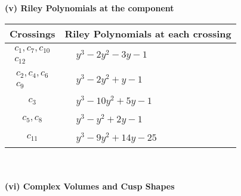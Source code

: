 \documentclass[1p]{elsarticle_modified}
\theoremstyle{definition}
\begin{document}
\newpage\renewcommand{\arraystretch}{1}
\flushleft \textbf{(v) Riley Polynomials at the component}\newline \\
\begin{tabular}{m{50pt}|m{274pt}}
Crossings & \hspace{64pt}Riley Polynomials at each crossing \\
\hline $$\begin{aligned}c_{1},c_{7},c_{10}\\c_{12}\end{aligned}$$&$\begin{aligned}
&y^3-2 y^2-3 y-1
\end{aligned}$\\
\hline $$\begin{aligned}c_{2},c_{4},c_{6}\\c_{9}\end{aligned}$$&$\begin{aligned}
&y^3-2 y^2+y-1
\end{aligned}$\\
\hline $$\begin{aligned}c_{3}\end{aligned}$$&$\begin{aligned}
&y^3-10 y^2+5 y-1
\end{aligned}$\\
\hline $$\begin{aligned}c_{5},c_{8}\end{aligned}$$&$\begin{aligned}
&y^3- y^2+2 y-1
\end{aligned}$\\
\hline $$\begin{aligned}c_{11}\end{aligned}$$&$\begin{aligned}
&y^3-9 y^2+14 y-25
\end{aligned}$\\
\hline
\end{tabular}\\~\\
\newpage\flushleft \textbf{(vi) Complex Volumes and Cusp Shapes}
\end{document}
